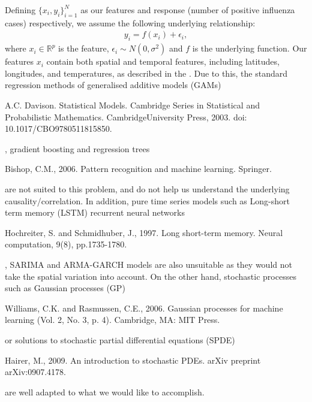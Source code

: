 \documentclass[letterpaper,10pt,english]{sphinxmanual}
\begin{document}
Defining \(\{x_i,y_i\}_{i=1}^N\) as our features and response (number of positive influenza cases) respectively, we assume the following underlying relationship:
\begin{equation*}
\begin{split}y_i = f(x_i) + \epsilon_i,\end{split}
\end{equation*}
where \(x_i\in\mathbb{R}^p\) is the feature, \(\epsilon_i\sim N(0,\sigma^2)\)
and \(f\)
is the underlying function. Our features \(x_i\) contain both spatial and temporal features, including latitudes, longitudes, and temperatures, as described in the . Due to this, the standard regression methods of generalised additive models (GAMs) %
\begin{footnote}[3]\sphinxAtStartFootnote
A.C. Davison. Statistical Models. Cambridge Series in Statistical and Probabilistic Mathematics. CambridgeUniversity Press, 2003. doi: 10.1017/CBO9780511815850.
%
\end{footnote}, gradient boosting and regression
trees %
\begin{footnote}[4]\sphinxAtStartFootnote
Bishop, C.M., 2006. Pattern recognition and machine learning. Springer.
%
\end{footnote} are not suited to this problem, and do not help us
understand the underlying causality/correlation. In addition, pure time series
models such as Long-short term memory (LSTM) recurrent neural networks %
\begin{footnote}[5]\sphinxAtStartFootnote
Hochreiter, S. and Schmidhuber, J., 1997. Long short-term memory. Neural computation, 9(8), pp.1735-1780.
%
\end{footnote},
SARIMA and ARMA-GARCH models \sphinxfootnotemark[3] are also unsuitable as they would not take the spatial variation into account. On the other hand, stochastic processes such as Gaussian processes (GP) %
\begin{footnote}[6]\sphinxAtStartFootnote
Williams, C.K. and Rasmussen, C.E., 2006. Gaussian processes for machine learning (Vol. 2, No. 3, p. 4). Cambridge, MA: MIT Press.
%
\end{footnote}
or solutions to stochastic partial differential equations (SPDE) %
\begin{footnote}[7]\sphinxAtStartFootnote
Hairer, M., 2009. An introduction to stochastic PDEs. arXiv preprint arXiv:0907.4178.
%
\end{footnote} are
well adapted to what we would like to accomplish.
\end{document}
